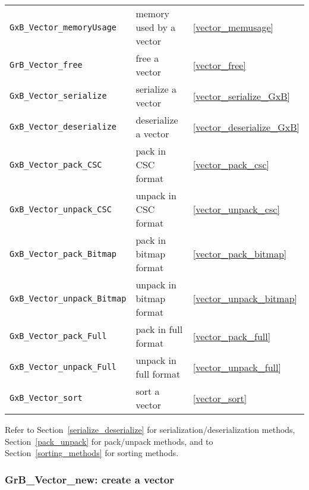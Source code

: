 \documentclass[12pt]{article}
\begin{document}
{\begin{tabular}{lll}
\verb'GxB_Vector_memoryUsage'    & memory used by a vector          & \ref{vector_memusage} \\
\verb'GrB_Vector_free'           & free a vector                    & \ref{vector_free} \\
\hline
\hline
\verb'GxB_Vector_serialize'      & serialize a vector               & \ref{vector_serialize_GxB} \\
\verb'GxB_Vector_deserialize'    & deserialize a vector             & \ref{vector_deserialize_GxB} \\
\hline
\hline
\verb'GxB_Vector_pack_CSC'         & pack in CSC format      & \ref{vector_pack_csc} \\
\verb'GxB_Vector_unpack_CSC'       & unpack in CSC format    & \ref{vector_unpack_csc} \\
\hline
\verb'GxB_Vector_pack_Bitmap'      & pack in bitmap format   & \ref{vector_pack_bitmap} \\
\verb'GxB_Vector_unpack_Bitmap'    & unpack in bitmap format & \ref{vector_unpack_bitmap} \\
\hline
\verb'GxB_Vector_pack_Full'        & pack in full format     & \ref{vector_pack_full} \\
\verb'GxB_Vector_unpack_Full'      & unpack in full format   & \ref{vector_unpack_full} \\
\hline
\hline
\verb'GxB_Vector_sort'          & sort a vector & \ref{vector_sort} \\
\end{tabular}
}

\vspace{0.2in}
Refer to
Section~\ref{serialize_deserialize} for serialization/deserialization methods,
Section~\ref{pack_unpack} for pack/unpack methods,
and to
Section~\ref{sorting_methods} for sorting methods.

\newpage
\subsubsection{{\sf GrB\_Vector\_new:}           create a vector}
\label{vector_new}
\end{document}
